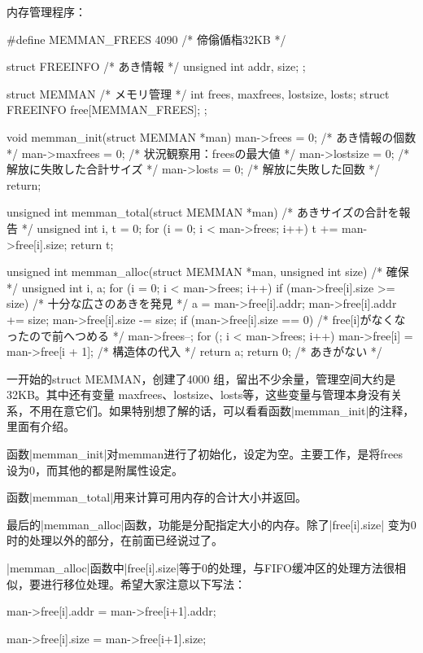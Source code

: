 内存管理程序：
\begin{code}[label=bootpack.c节选]
#define MEMMAN_FREES		4090	/* 偙傟偱栺32KB */

struct FREEINFO {	/* あき情報 */
	unsigned int addr, size;
};

struct MEMMAN {		/* メモリ管理 */
	int frees, maxfrees, lostsize, losts;
	struct FREEINFO free[MEMMAN_FREES];
};

void memman_init(struct MEMMAN *man)
{
	man->frees = 0;			/* あき情報の個数 */
	man->maxfrees = 0;		/* 状況観察用：freesの最大値 */
	man->lostsize = 0;		/* 解放に失敗した合計サイズ */
	man->losts = 0;			/* 解放に失敗した回数 */
	return;
}

unsigned int memman_total(struct MEMMAN *man)
/* あきサイズの合計を報告 */
{
	unsigned int i, t = 0;
	for (i = 0; i < man->frees; i++) {
		t += man->free[i].size;
	}
	return t;
}

unsigned int memman_alloc(struct MEMMAN *man, unsigned int size)
/* 確保 */
{
	unsigned int i, a;
	for (i = 0; i < man->frees; i++) {
		if (man->free[i].size >= size) {
			/* 十分な広さのあきを発見 */
			a = man->free[i].addr;
			man->free[i].addr += size;
			man->free[i].size -= size;
			if (man->free[i].size == 0) {
				/* free[i]がなくなったので前へつめる */
				man->frees--;
				for (; i < man->frees; i++) {
					man->free[i] = man->free[i + 1]; /* 構造体の代入 */
				}
			}
			return a;
		}
	}
	return 0; /* あきがない */
}
\end{code}

一开始的struct MEMMAN，创建了4000 组，留出不少余量，管理空间大约是32KB。其中还有变量 maxfrees、lostsize、losts等，这些变量与管理本身没有关系，不用在意它们。如果特别想了解的话，可以看看函数|memman_init|的注释，里面有介绍。

函数|memman_init|对memman进行了初始化，设定为空。主要工作，是将frees 设为0，而其他的都是附属性设定。

函数|memman_total|用来计算可用内存的合计大小并返回。

最后的|memman_alloc|函数，功能是分配指定大小的内存。除了|free[i].size| 变为0时的处理以外的部分，在前面已经说过了。

|memman_alloc|函数中|free[i].size|等于0的处理，与FIFO缓冲区的处理方法很相似，要进行移位处理。希望大家注意以下写法：
\begin{code}
man->free[i].addr = man->free[i+1].addr;

man->free[i].size = man->free[i+1].size;
\end{code}


